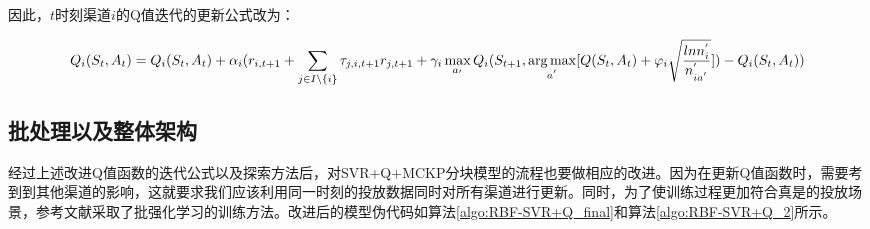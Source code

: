 因此，$t$时刻渠道$i$的Q值迭代的更新公式改为：

\begin{dmath}
\label{seq_modified_Q_}
Q_{i}(S_{t},A_{t})=Q_{i}(S_{t},A_{t})+\alpha_{i}(r_{i, t+1} + \sum_{j \in I \backslash \{i\}} \tau_{j,i,t+1} r_{j, t+1} + \gamma_{i} \max_{a_{'}} Q_{i}(S_{t+1}, \argmax_{a^{'}}[Q(S_{t},A_{t})+ \varphi_{i} \sqrt{\frac{ln n_{i}^{'}}{n^{'}_{i a^{'}}}}]) - Q_{i}(S_{t},A_{t}))
\end{dmath}



\subsection{批处理以及整体架构}
经过上述改进Q值函数的迭代公式以及探索方法后，对SVR+Q+MCKP分块模型的流程也要做相应的改进。因为在更新Q值函数时，需要考到到其他渠道的影响，这就要求我们应该利用同一时刻的投放数据同时对所有渠道进行更新。同时，为了使训练过程更加符合真是的投放场景，参考文献\citep{pednault2002sequential}采取了批强化学习的训练方法。改进后的模型伪代码如算法\eqref{algo:RBF-SVR+Q_final}和算法\eqref{algo:RBF-SVR+Q_2}所示。

